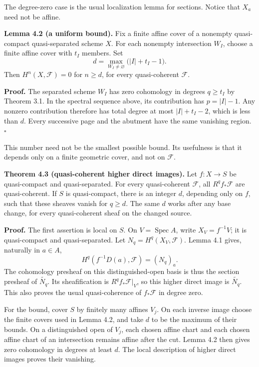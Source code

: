 \documentclass[11pt]{article}
\begin{document}
The degree-zero case is the usual localization lemma for sections.
Notice that \(X_a\) need not be affine.

\textbf{Lemma 4.2 (a uniform bound).} Fix a finite affine cover of a
nonempty quasi-compact quasi-separated scheme \(X\). For each nonempty
intersection \(W_I\), choose a finite affine cover with \(t_I\) members.
Set \[
d=\max_{W_I\ne\varnothing}\bigl(|I|+t_I-1\bigr).
\] Then \(H^n(X,\mathcal F)=0\) for \(n\ge d\), for every quasi-coherent
\(\mathcal F\).

\textbf{Proof.} The separated scheme \(W_I\) has zero cohomology in
degrees \(q\ge t_I\) by Theorem 3.1. In the spectral sequence above, its
contribution has \(p=|I|-1\). Any nonzero contribution therefore has
total degree at most \(|I|+t_I-2\), which is less than \(d\). Every
successive page and the abutment have the same vanishing region.
\(\square\)

This number need not be the smallest possible bound. Its usefulness is
that it depends only on a finite geometric cover, and not on
\(\mathcal F\).

\textbf{Theorem 4.3 (quasi-coherent higher direct images).} Let
\(f:X\to S\) be quasi-compact and quasi-separated. For every
quasi-coherent \(\mathcal F\), all \(R^qf_*\mathcal F\) are
quasi-coherent. If \(S\) is quasi-compact, there is an integer \(d\),
depending only on \(f\), such that these sheaves vanish for \(q\ge d\).
The same \(d\) works after any base change, for every quasi-coherent
sheaf on the changed source.

\textbf{Proof.} The first assertion is local on \(S\). On
\(V=\operatorname{Spec}A\), write \(X_V=f^{-1}V\); it is quasi-compact
and quasi-separated. Let \(N_q=H^q(X_V,\mathcal F)\). Lemma 4.1 gives,
naturally in \(a\in A\), \[
H^q(f^{-1}D(a),\mathcal F)=(N_q)_a.
\] The cohomology presheaf on this distinguished-open basis is thus the
section presheaf of \(\widetilde {N_q}\). Its sheafification is
\(R^qf_*\mathcal F|_V\), so this higher direct image is
\(\widetilde {N_q}\). This also proves the usual quasi-coherence of
\(f_*\mathcal F\) in degree zero.

For the bound, cover \(S\) by finitely many affines \(V_j\). On each
inverse image choose the finite covers used in Lemma 4.2, and take \(d\)
to be the maximum of their bounds. On a distinguished open of \(V_j\),
each chosen affine chart and each chosen affine chart of an intersection
remains affine after the cut. Lemma 4.2 then gives zero cohomology in
degrees at least \(d\). The local description of higher direct images
proves their vanishing.
\end{document}
